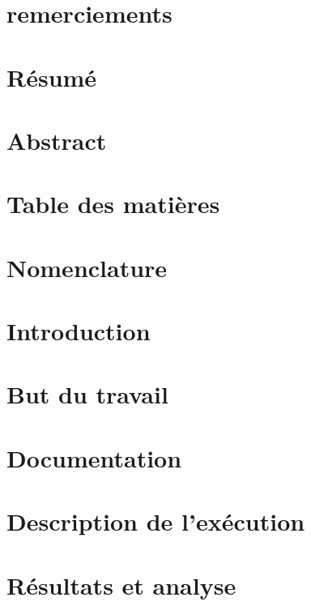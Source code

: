 \documentclass[a4paper, 12pt, DIV=12]{scrartcl}
\begin{document}
\renewcommand\thesection{\roman{section}}
\section{remerciements}
\blindtext
\newpage

\section{Résumé}
\blindtext
\newpage

\section{Abstract}
\blindtext
\newpage

\section{Table des matières}
\tableofcontents
\newpage

\section{Nomenclature}
\newpage

\setcounter{section}{0}
\renewcommand\thesection{\arabic{section}}


\section{Introduction}

\blindtext[2]
\newpage

\section{But du travail}
\newpage

\section{Documentation}
\newpage

\section{Description de l'exécution}
\newpage


\section{Résultats et analyse}
\newpage
\end{document}
